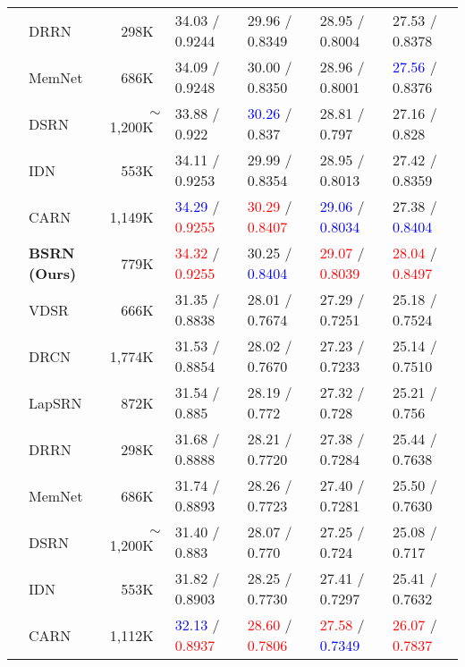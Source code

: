 \documentclass[runningheads]{llncs}
\begin{document}
\begin{table*}[t!]
\begin{center}
\begin{tabular}{c l r l l l l}
			& DRRN \cite{tai2017image} & 298K~ & 34.03 / 0.9244 & 29.96 / 0.8349 & 28.95 / 0.8004 & 27.53 / 0.8378 \\
			& MemNet \cite{tai2017memnet} & 686K~ & 34.09 / 0.9248 & 30.00 / 0.8350 & 28.96 / 0.8001 & \textcolor{blue}{27.56} / 0.8376 \\
			& DSRN \cite{han2018image} & $\sim$1,200K~ & 33.88 / 0.922~~ & \textcolor{blue}{30.26} / 0.837~~ & 28.81 / 0.797~~ & 27.16 / 0.828~~ \\
			& IDN \cite{hui2018fast} & 553K~ & 34.11 / 0.9253 & 29.99 / 0.8354 & 28.95 / 0.8013 & 27.42 / 0.8359 \\
			& CARN \cite{ahn2018fast} & 1,149K~ & \textcolor{blue}{34.29} / \textcolor{red}{0.9255} & \textcolor{red}{30.29} / \textcolor{red}{0.8407} & \textcolor{blue}{29.06} / \textcolor{blue}{0.8034} & 27.38 / \textcolor{blue}{0.8404} \\
			& \textbf{BSRN (Ours)} & 779K~ & \textcolor{red}{34.32} / \textcolor{red}{0.9255} & 30.25 / \textcolor{blue}{0.8404} & \textcolor{red}{29.07} / \textcolor{red}{0.8039} & \textcolor{red}{28.04} / \textcolor{red}{0.8497} \\
			\noalign{\smallskip}
			\hline
			\noalign{\smallskip}
			\multirow{9}{*}{$\times$4} & VDSR \cite{kim2016accurate} & 666K~ & 31.35 / 0.8838 & 28.01 / 0.7674 & 27.29 / 0.7251 & 25.18 / 0.7524 \\
			& DRCN \cite{kim2016deeply} & 1,774K~ & 31.53 / 0.8854 & 28.02 / 0.7670 & 27.23 / 0.7233 & 25.14 / 0.7510 \\
			& LapSRN \cite{lai2017deep} & 872K~ & 31.54 / 0.885~~ & 28.19 / 0.772~~ & 27.32 / 0.728~~ & 25.21 / 0.756~~ \\
			& DRRN \cite{tai2017image} & 298K~ & 31.68 / 0.8888 & 28.21 / 0.7720 & 27.38 / 0.7284 & 25.44 / 0.7638 \\
			& MemNet \cite{tai2017memnet} & 686K~ & 31.74 / 0.8893 & 28.26 / 0.7723 & 27.40 / 0.7281 & 25.50 / 0.7630 \\
			& DSRN \cite{han2018image} & $\sim$1,200K~ & 31.40 / 0.883~~ & 28.07 / 0.770~~ & 27.25 / 0.724~~ & 25.08 / 0.717~~ \\
			& IDN \cite{hui2018fast} & 553K~ & 31.82 / 0.8903 & 28.25 / 0.7730 & 27.41 / 0.7297 & 25.41 / 0.7632 \\
			& CARN \cite{ahn2018fast} & 1,112K~ & \textcolor{blue}{32.13} / \textcolor{red}{0.8937} & \textcolor{red}{28.60} / \textcolor{red}{0.7806} & \textcolor{red}{27.58} / \textcolor{blue}{0.7349} & \textcolor{red}{26.07} / \textcolor{red}{0.7837} \\

\end{tabular}
\end{center}
\end{table*}
\end{document}
